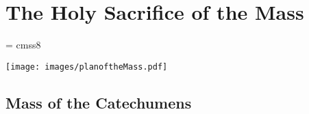 \def\tabmark{The Mass}
\chapter{The Holy Sacrifice of the Mass}

{\setlength{\parskip}{6pt}



\label{cha:themass}

\font\notelett = cmss8

\def\celebrant#1{\Pnobar #1}
\def\all#1{\Rbar \textbf{#1}}



\def\See#1{\relax}

\normalsize%


%

\centerline{\texttt{[image: images/planoftheMass.pdf]}}



\section{Mass of the Catechumens}


}
